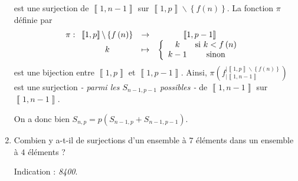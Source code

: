 \documentclass[a4paper,french,bookmarks]{article}
\begin{document}
\begin{enumerate}
{\begin{enumerate}
            est une surjection de $\left\llbracket 1, n-1\right\rrbracket$ sur $\left\llbracket 1, p\right\rrbracket \backslash \left\{ f\left(n\right) \right\}$. La fonction $\pi$ définie par
            \[ \pi : \begin{array}[t]{ccc}
                \left\llbracket 1, p\right\rrbracket \backslash \left\{ f\left(n\right) \right\} &\to& \left\llbracket 1, p-1\right\rrbracket \\
                k &\mapsto & \left\lbrace\begin{array}{cc}
                    k &\text{si} \ k < f\left(n\right)  \\
                    k - 1 &\text{sinon} 
                \end{array}\right.
            \end{array} \]
            est une bijection entre $\left\llbracket 1, p\right\rrbracket$ et $\left\llbracket 1, p-1\right\rrbracket$. Ainsi, $\pi\left(f_{\vert \left\llbracket 1, n-1\right\rrbracket}^{\vert \left\llbracket 1, p\right\rrbracket \backslash \left\{ f\left(n\right) \right\}}\right)$ est une surjection \textit{- parmi les $S_{n-1, p-1}$ possibles -} de $\left\llbracket 1, n-1\right\rrbracket$ sur $ \left\llbracket 1, n-1\right\rrbracket$.
        \end{enumerate}
        
        On a donc bien $S_{n, p} = p\left(S_{n-1, p} + S_{n-1, p-1}\right)$.
    }
    
    \item Combien y a-t-il de surjections d'un ensemble à $7$
    éléments dans un ensemble à $4$ éléments ? 
    
    {{\EBGaramond Indication :} \footnotesize\itshape 8400}.
    
\end{enumerate}
\end{document}
